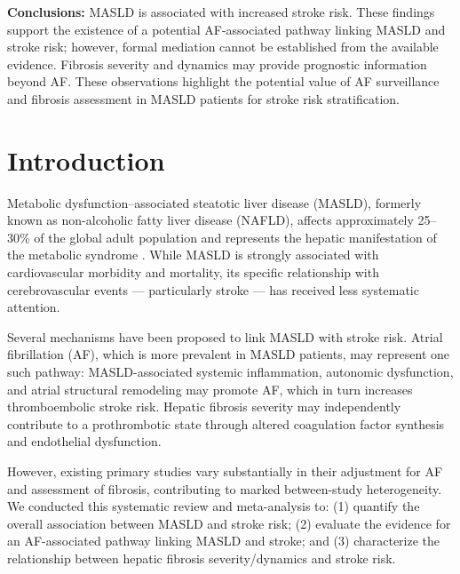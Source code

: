 \documentclass[12pt,a4paper]{article}
\begin{document}
\textbf{Conclusions:} MASLD is associated with increased stroke risk. These findings support the existence of a potential AF-associated pathway linking MASLD and stroke risk; however, formal mediation cannot be established from the available evidence. Fibrosis severity and dynamics may provide prognostic information beyond AF. These observations highlight the potential value of AF surveillance and fibrosis assessment in MASLD patients for stroke risk stratification.

\newpage

\section{Introduction}

Metabolic dysfunction--associated steatotic liver disease (MASLD), formerly known as non-alcoholic fatty liver disease (NAFLD), affects approximately 25--30\% of the global adult population and represents the hepatic manifestation of the metabolic syndrome \cite{}. While MASLD is strongly associated with cardiovascular morbidity and mortality, its specific relationship with cerebrovascular events — particularly stroke — has received less systematic attention.

Several mechanisms have been proposed to link MASLD with stroke risk. Atrial fibrillation (AF), which is more prevalent in MASLD patients, may represent one such pathway: MASLD-associated systemic inflammation, autonomic dysfunction, and atrial structural remodeling may promote AF, which in turn increases thromboembolic stroke risk. Hepatic fibrosis severity may independently contribute to a prothrombotic state through altered coagulation factor synthesis and endothelial dysfunction.

However, existing primary studies vary substantially in their adjustment for AF and assessment of fibrosis, contributing to marked between-study heterogeneity. We conducted this systematic review and meta-analysis to: (1) quantify the overall association between MASLD and stroke risk; (2) evaluate the evidence for an AF-associated pathway linking MASLD and stroke; and (3) characterize the relationship between hepatic fibrosis severity/dynamics and stroke risk.

\end{document}
